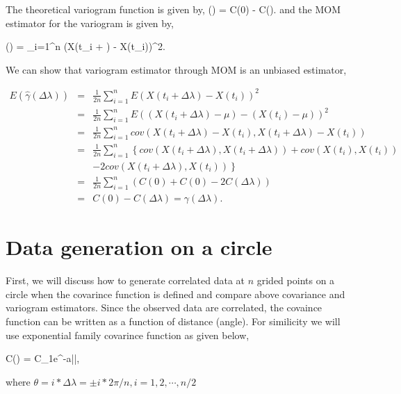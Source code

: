 The theoretical variogram function is given by,
\beq
\gamma(\theta) = C(0) - C(\theta).
\eeq
and the MOM estimator for the variogram is given by,

\beq
\hat{\gamma}(\Delta \lambda) =  \sum_{i=1}^n (X(t_i + \Delta \lambda) - X(t_i))^2.
\eeq

We can show that variogram estimator through MOM is an unbiased estimator, 

\begin{eqnarray*}
	E(\hat{\gamma}(\Delta \lambda)) &=& \frac{1}{2n} \sum_{i = 1}^n E(X(t_i + \Delta \lambda) - X(t_i))^2 \\
	&=& \frac{1}{2n} \sum_{i = 1}^n E((X(t_i + \Delta \lambda)-\mu) - (X(t_i) - \mu))^2 \\
	&=& \frac{1}{2n} \sum_{i = 1}^n cov(X(t_i + \Delta \lambda) - X(t_i), X(t_i + \Delta \lambda) - X(t_i)) \\
	&=& \frac{1}{2n} \sum_{i = 1}^n \left\{ cov(X(t_i + \Delta \lambda), X(t_i + \Delta \lambda)) + cov(X(t_i), X(t_i)) \right. \\
	& & \left. - 2cov(X(t_i + \Delta \lambda), X(t_i)) \right\}\\
	&=& \frac{1}{2n} \sum_{i = 1}^n \left( C(0) + C(0) - 2C(\Delta \lambda)\right) \\
	&=& C(0) - C(\Delta \lambda) = \gamma(\Delta \lambda).
\end{eqnarray*}
 


\section{Data generation on a circle}



First, we will discuss how to generate correlated data at $n$ grided points on a circle when the covarince function is defined and compare above covariance and variogram estimators. Since the observed data are correlated, the covaince function can be written as a function of distance (angle). For similicity we will use exponential family covarince function as given below, 

\beq \label{exp_covarince} 
C(\theta) = C_1e^{-a|\theta|},
\eeq

where $\theta = i*\Delta\lambda = \pm i*2\pi/n, i=1,2,\cdots,n/2$\\

